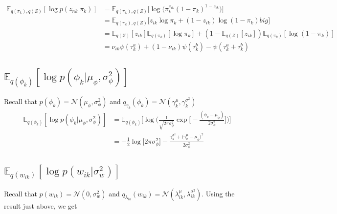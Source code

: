 \documentclass[11pt]{article}
\theoremstyle{definition}
\theoremstyle{plain}
\newcommand{\E}{\mathbb{E}}
\begin{document}
\begin{align*}
    \E_{q(\pi_k),q(Z)}[\log p (z_{nk}|\pi_k)] 
        &= \E_{q(\pi_k),q(Z)}\big[\log \big(\pi_k^{z_{ik}}(1 - \pi_k)^{1 - z_{ik}}\big)\big]\\
        &= \E_{q(\pi_k),q(Z)}\big[ z_{ik} \log \pi_k + (1 - z_{ik})\log(1 - \pi_k) big]\\
        &= \E_{q(Z)}[z_{ik}] \E_{q(\pi_k)}[\log \pi_k] +  
            (1 - \E_{q(Z)}[z_{ik}]) \E_{q(\pi_k)}[\log(1 - \pi_k)]\\
        &= \nu_{ik} \psi(\tau_k^a) + (1 - \nu_{ik})\psi(\tau_k^b) - \psi(\tau_k^a + \tau_k^b)
\end{align*}






\subsection{$\E_{q(\phi_k)}[\log p(\phi_k|\mu_{\phi},\sigma^2_\phi)]$}


\noindent Recall that $p(\phi_k) = \mathcal{N}(\mu_{\phi},\sigma^2_{\phi})$
and $q_{\gamma_k}(\phi_k) = 
\mathcal{N}(\gamma_{k}^{\mu}, \gamma_{k}^{\sigma^2})$\\

\begin{align*}
    \E_{q(\phi_k)}[\log p(\phi_k|\mu_{\phi},\sigma^2_\phi)] &=
        \E_{q(\phi_k)}
            \Big[%
            \log \Big(%
                \frac{1}{\sqrt{2 \pi \sigma^2_\phi}} \exp 
                \big[-\frac{(\phi_k - \mu_{\phi})}{2 \sigma^2_\phi}\big]
            \Big)%
            \Big]%
            \\
       &= -\frac{1}{2} \log \Big[2 \pi \sigma^2_{\phi} \Big]
          - \frac{\gamma_{k}^{\sigma^2} + \big(\gamma_k^{\mu} - 
          \mu_{\phi} \big)^2}{2 \sigma^2_{\phi}}
\end{align*}


\subsection{$\E_{q(w_{ik})}[ \log p(w_{ik}|\sigma^2_w)]$}



\noindent Recall that $p(w_{ik}) = \mathcal{N}(0, \sigma^2_w)$
and $q_{\lambda_{ik}}(w_{ik}) = 
\mathcal{N}(\lambda_{ik}^{\mu}, \lambda_{ik}^{\sigma^2})$. Using the result just
above, we get
\end{document}
